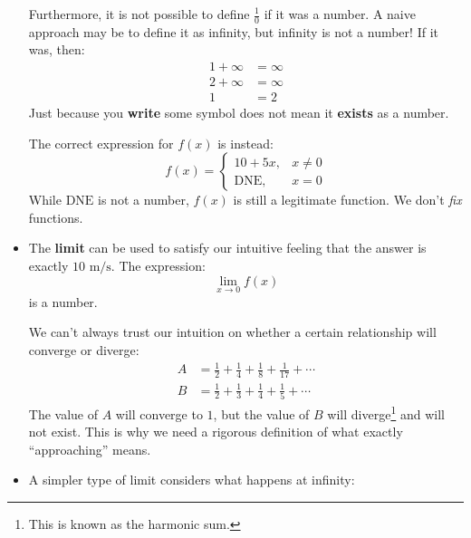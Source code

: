 \begin{itemize}
\begin{warning}
        Furthermore, it is not possible to define $\frac{1}{0}$ if it was a number. A naive approach may be to define it as infinity, but infinity is not a number! If it was, then:
        \begin{align}
            1+\infty &= \infty \\ 
            2+\infty &= \infty \\ 
            1 &= 2
        \end{align}
        Just because you \textbf{write} some symbol does not mean it \textbf{exists} as a number.
    \end{warning}
    The correct expression for $f(x)$ is instead:
    \begin{equation}
        f(x) = \begin{cases}10+5x, & x\neq 0 \\ \text{DNE}, & x=0\end{cases}
        \label{eq:10x+5x^2}
    \end{equation}
    While $\text{DNE}$ is not a number, $f(x)$ is still a legitimate function. We don't \textit{fix} functions.
    \item The \textbf{limit} can be used to satisfy our intuitive feeling that the answer is exactly $10 \text{ m/s}$. The expression:
    \begin{equation}
        \lim_{x\to 0}f(x)
        \label{eq:}
    \end{equation}
    is a number.
    \begin{warning}
        We can't always trust our intuition on whether a certain relationship will converge or diverge:
        \begin{align}
            A &= \frac{1}{2}+\frac{1}{4}+\frac{1}{8}+\frac{1}{17}+\cdots \\ 
            B &= \frac{1}{2}+\frac{1}{3}+\frac{1}{4}+\frac{1}{5} + \cdots
        \end{align}
        The value of $A$ will converge to $1$, but the value of $B$ will diverge\footnote{This is known as the harmonic sum.} and will not exist. This is why we need a rigorous definition of what exactly ``approaching'' means.
    \end{warning}
    \item A simpler type of limit considers what happens at infinity:
    \begin{center}
\end{center}
\end{itemize}
